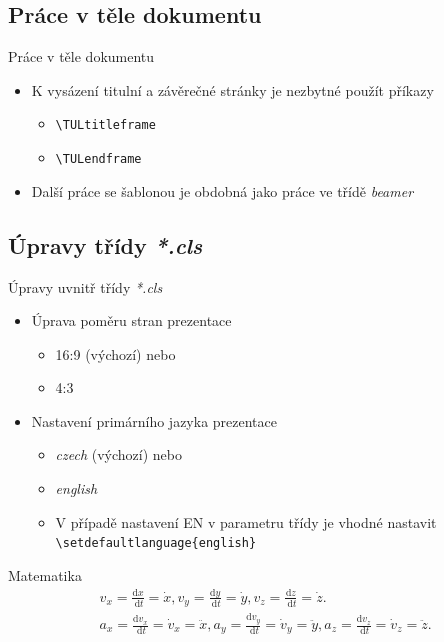 \documentclass[TUL,aspect169]{tulpresentation} %
\begin{document}
\subsection{Práce v těle dokumentu}
\begin{frame}[fragile]{Práce v těle dokumentu}
  \begin{itemize}
    \item K vysázení titulní a závěrečné stránky je nezbytné použít příkazy
    \begin{itemize}
        \item \verb|\TULtitleframe|  
        \item \verb|\TULendframe| 
    \end{itemize} 
    \item Další práce se šablonou je obdobná jako práce ve třídě \emph{beamer}
  \end{itemize}    
\end{frame}  

\subsection{Úpravy třídy \emph{*.cls}}
\begin{frame}[fragile]{Úpravy uvnitř třídy \emph{*.cls}}
  \begin{itemize}
      \item Úprava poměru stran prezentace 
      \begin{itemize}
        \item 16:9 (výchozí) nebo 
        \item 4:3
      \end{itemize}
      
      \item Nastavení primárního jazyka prezentace
      \begin{itemize}
        \item \emph{czech} (výchozí) nebo 
        \item \emph{english}
        \item V případě nastavení EN v parametru třídy je vhodné nastavit    
        \verb|\setdefaultlanguage{english}|
      \end{itemize}
  \end{itemize}
\end{frame}

\begin{frame}{Matematika}
    \begin{equation}
       \begin{aligned} & v_x=\frac{\mathrm{d} x}{\mathrm{~d} t}=\dot{x}, v_y=\frac{\mathrm{d} y}{\mathrm{~d} t}=\dot{y}, v_z=\frac{\mathrm{d} z}{\mathrm{~d} t}=\dot{z} . \\ & a_x=\frac{\mathrm{d} v_x}{\mathrm{~d} t}=\dot{v}_x=\ddot{x}, a_y=\frac{\mathrm{d} v_y}{\mathrm{~d} t}=\dot{v}_y=\ddot{y}, a_z=\frac{\mathrm{d} v_z}{\mathrm{~d} t}=\dot{v}_z=\ddot{z} .\end{aligned}
    \end{equation}
\end{frame}
\end{document}

